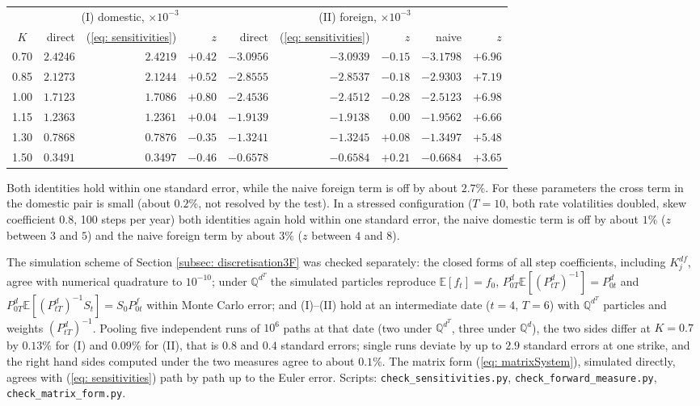 \begin{center}
\begin{tabular}{c|rrr|rrr|rr}
\toprule
 & \multicolumn{3}{c|}{(I) domestic, $\times10^{-3}$} & \multicolumn{5}{c}{(II) foreign, $\times10^{-3}$}\\
$K$ & direct & (\ref{eq: sensitivities}) & $z$ & direct & (\ref{eq: sensitivities}) & $z$ & naive & $z$\\
\midrule
0.70 & $2.4246$ & $2.4219$ & $+0.42$ & $-3.0956$ & $-3.0939$ & $-0.15$ & $-3.1798$ & $+6.96$\\
0.85 & $2.1273$ & $2.1244$ & $+0.52$ & $-2.8555$ & $-2.8537$ & $-0.18$ & $-2.9303$ & $+7.19$\\
1.00 & $1.7123$ & $1.7086$ & $+0.80$ & $-2.4536$ & $-2.4512$ & $-0.28$ & $-2.5123$ & $+6.98$\\
1.15 & $1.2363$ & $1.2361$ & $+0.04$ & $-1.9139$ & $-1.9138$ & $0.00$ & $-1.9562$ & $+6.66$\\
1.30 & $0.7868$ & $0.7876$ & $-0.35$ & $-1.3241$ & $-1.3245$ & $+0.08$ & $-1.3497$ & $+5.48$\\
1.50 & $0.3491$ & $0.3497$ & $-0.46$ & $-0.6578$ & $-0.6584$ & $+0.21$ & $-0.6684$ & $+3.65$\\
\bottomrule
\end{tabular}
\end{center}

\noindent Both identities hold within one standard error, while the naive foreign term is off by about $2.7\%$. For these parameters the cross term in the domestic pair is small (about $0.2\%$, not resolved by the test). In a stressed configuration ($T=10$, both rate volatilities doubled, skew coefficient $0.8$, 100 steps per year) both identities again hold within one standard error, the naive domestic term is off by about $1\%$ ($z$ between $3$ and $5$) and the naive foreign term by about $3\%$ ($z$ between $4$ and $8$).

The simulation scheme of Section \ref{subsec: discretisation3F} was checked separately: the closed forms of all step coefficients, including $K^{df}_j$, agree with numerical quadrature to $10^{-10}$; under $\mathbb{Q}^{d^T}$ the simulated particles reproduce $\mathbb{E}[f_t]=f_0$, $P^d_{0T}\mathbb{E}[(P^d_{tT})^{-1}]=P^d_{0t}$ and $P^d_{0T}\mathbb{E}[(P^d_{tT})^{-1}S_t]=S_0P^f_{0t}$ within Monte Carlo error; and (I)--(II) hold at an intermediate date ($t=4$, $T=6$) with $\mathbb{Q}^{d^T}$ particles and weights $(P^d_{tT})^{-1}$. Pooling five independent runs of $10^6$ paths at that date (two under $\mathbb{Q}^{d^T}$, three under $\mathbb{Q}^d$), the two sides differ at $K=0.7$ by $0.13\%$ for (I) and $0.09\%$ for (II), that is $0.8$ and $0.4$ standard errors; single runs deviate by up to $2.9$ standard errors at one strike, and the right hand sides computed under the two measures agree to about $0.1\%$.
The matrix form (\ref{eq: matrixSystem}), simulated directly, agrees with (\ref{eq: sensitivities}) path by path up to the Euler error. Scripts: \texttt{check\_sensitivities.py}, \texttt{check\_forward\_measure.py}, \texttt{check\_matrix\_form.py}.
